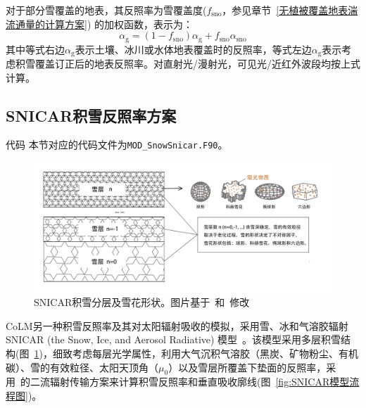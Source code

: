对于部分雪覆盖的地表，其反照率为雪覆盖度($f_{\mathrm{sno}}$，参见章节~\ref{无植被覆盖地表湍流通量的计算方案}) 的加权函数，表示为：
\begin{equation}
  \alpha_{\mathrm{g}}=\left(1-f_{\mathrm{sno}}\right) \alpha_{\mathrm{g}} + f_{\mathrm{sno}} \alpha_{\mathrm{sno}}
\end{equation}
其中等式右边$\alpha_{\mathrm{g}}$表示土壤、冰川或水体地表覆盖时的反照率，等式左边$\alpha_{\mathrm{g}}$表示考虑积雪覆盖订正后的地表反照率。对直射光/漫射光，可见光/近红外波段均按上式计算。

\subsection{SNICAR积雪反照率方案}\label{SNICAR积雪反照率}
\begin{mymdframed}{代码}
  本节对应的代码文件为\texttt{MOD\_SnowSnicar.F90}。
\end{mymdframed}

{
  \begin{figure}[htbp]
    \centering
    \includegraphics[width=0.9\columnwidth]{Figures/辐射过程及辐射通量计算/SNICAR积雪分层及雪花形状_v2.jpg}
    \caption[SNICAR积雪分层及雪花形状]{SNICAR积雪分层及雪花形状。图片基于~\citet{he2017ImpactSnowGrain}和~\citet{whicker2022SNICARADv4PhysicallyBased}修改}
    \label{fig:SNICAR积雪分层及雪花形状}
  \end{figure}
}

CoLM另一种积雪反照率及其对太阳辐射吸收的模拟，采用雪、冰和气溶胶辐射SNICAR (the Snow, Ice, and Aerosol Radiative) 模型~\citep{flanner2021SNICARADv3CommunityTool}。该模型采用多层积雪结构(图~\ref{fig:SNICAR积雪分层及雪花形状})，细致考虑每层光学属性，利用大气沉积气溶胶（黑炭、矿物粉尘、有机碳）、雪的有效粒径、太阳天顶角（$\mu_{0}$）以及雪层所覆盖下垫面的反照率，采用~\citet{toon1989RapidCalculationRadiative}的二流辐射传输方案来计算积雪反照率和垂直吸收廓线(图~\ref{fig:SNICAR模型流程图})。

